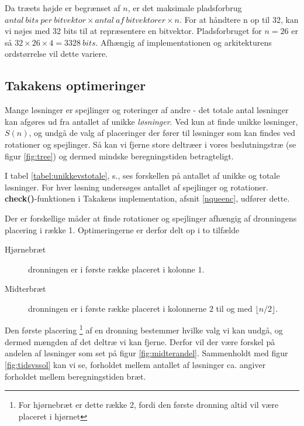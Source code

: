 \documentclass[final,a4paper,11pt]{article}
\begin{document}
Da træets højde er begrænset af $n$, er det maksimale pladsforbrug $antal\ bits\ per\ bitvektor \times antal\ af\ bitvektorer \times n$. For at håndtere n op til 32, kan vi nøjes med 32 bits til at repræsentere en bitvektor. Pladsforbruget for $n=26$ er så $32\times 26 \times 4 = 3328\ bits$. Afhængig af implementationen og arkitekturens ordstørrelse vil dette variere. 

\subsection{Takakens optimeringer}\label{takalgo}

Mange løsninger er spejlinger og roteringer af andre - det totale antal løsninger kan afgøres ud fra antallet af unikke \emph{løsninger}. Ved kun at finde unikke løsninger, $S(n)$, og undgå de valg af placeringer der fører til løsninger som kan findes ved rotationer og spejlinger. Så kan vi fjerne store deltræer i vores beslutningstræ (se figur \ref{fig:tree}) og dermed mindske beregningstiden betragteligt.

I tabel \ref{tabel:unikkevstotale}, s.\pageref{tabel:unikkevstotale}, ses forskellen på antallet af unikke og totale løsninger. For hver løsning undersøges antallet af spejlinger og rotationer. \textbf{check()}-funktionen i Takakens implementation, afsnit \ref{nqueenc}, udfører dette. 
 
Der er forskellige måder at finde rotationer og spejlinger afhængig af dronningens placering i række 1. Optimeringerne er derfor delt op i to tilfælde

\begin{description}
	\item[Hjørnebræt] dronningen er i første række placeret i kolonne $1$.
	\item[Midterbræt] dronningen er i første række placeret i kolonnerne $2$  til og med $\lfloor n/2 \rfloor$.
\end{description}

Den første placering \footnote{For hjørnebræt er dette række 2, fordi den første dronning altid vil være placeret i hjørnet} af en dronning bestemmer hvilke valg vi kan undgå, og dermed mængden af det deltræ vi kan fjerne. Derfor vil der være forskel på andelen af løsninger som set på figur \ref{fig:midterandel}. Sammenholdt med figur \ref{fig:tidsvssol} kan vi se, forholdet mellem antallet af løsninger ca. angiver forholdet mellem beregningstiden bræt.
\end{document}
